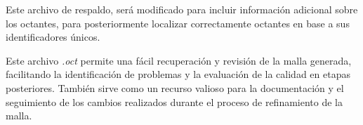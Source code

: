 \begin{itemize}
    Este archivo de respaldo, será modificado para incluir información adicional sobre los octantes, para posteriormente localizar correctamente octantes en base a sus identificadores únicos.
    
    Este archivo \textit{.oct} permite una fácil recuperación y revisión de la malla generada, facilitando la identificación de problemas y la evaluación de la calidad en etapas posteriores.
    También sirve como un recurso valioso para la documentación y el seguimiento de los cambios realizados durante el proceso de refinamiento de la malla.
\end{itemize}
    











